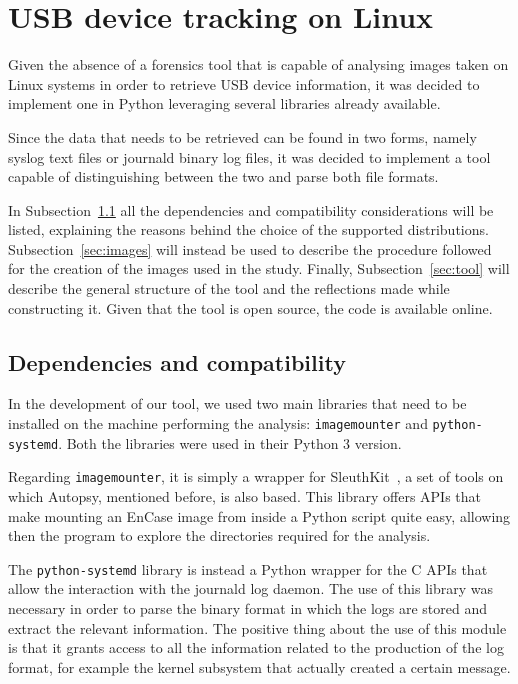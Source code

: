 \documentclass[a4paper,twocolumn]{article}
\begin{document}
\section{USB device tracking on Linux}
\label{sec:contrib}
Given the absence of a forensics tool that is capable of analysing images taken
on Linux systems in order to retrieve USB device information, it was decided to
implement one in Python leveraging several libraries already available.

Since the data that needs to be retrieved can be found in two forms, namely
syslog text files or journald binary log files, it was decided to implement a
tool capable of distinguishing between the two and parse both file formats.

In Subsection~\ref{sec:prems} all the dependencies and compatibility
considerations will be listed, explaining the reasons behind the choice of the
supported distributions. Subsection~\ref{sec:images} will instead be used to
describe the procedure followed for the creation of the images used in the
study. Finally, Subsection~\ref{sec:tool} will describe the general structure of
the tool and the reflections made while constructing it. Given that the tool is
open source, the code is available online.~\cite{ourtool}

\subsection{Dependencies and compatibility}
\label{sec:prems}
In the development of our tool, we used two main libraries that need
to be installed on the machine performing the analysis:
\texttt{imagemounter} and \texttt{python-systemd}. Both the libraries were used
in their Python 3 version.

Regarding \texttt{imagemounter}, it is simply a wrapper for
SleuthKit~\cite{sleuthkit}, a set of tools on which Autopsy, mentioned before,
is also based.  This library offers APIs that make mounting an EnCase image from
inside a Python script quite easy, allowing then the program to explore the
directories required for the analysis.

The \texttt{python-systemd} library is instead a Python wrapper for the C APIs
that allow the interaction with the journald log daemon. The use of this library
was necessary in order to parse the binary format in which the logs are stored
and extract the relevant information. The positive thing about the use of this
module is that it grants access to all the information related to the production
of the log format, for example the kernel subsystem that actually created a
certain message.
\end{document}
